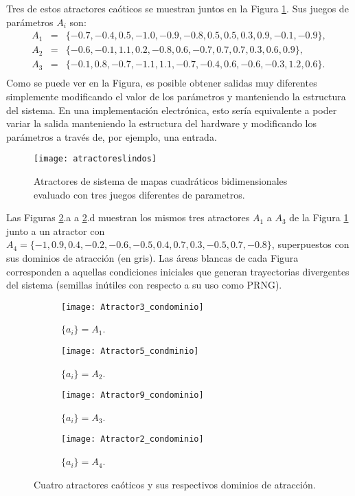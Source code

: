 Tres de estos atractores caóticos se muestran juntos en la Figura \ref{fig:atractoresQMaps}.
Sus juegos de parámetros $A_i$ son:	
%
\begin{eqnarray}
A_1 &=& \{-0.7,-0.4,0.5,-1.0,-0.9,-0.8,0.5,0.5,0.3,0.9,-0.1,-0.9\},\nonumber\\
A_2 &=& \{-0.6,-0.1,1.1,0.2,-0.8,0.6,-0.7,0.7,0.7,0.3,0.6,0.9\}, \nonumber\\
A_3 &=& \{-0.1,0.8,-0.7,-1.1,1.1,-0.7,-0.4,0.6,-0.6,-0.3,1.2,0.6\}.\nonumber\\
\end{eqnarray}
%
Como se puede ver en la Figura, es posible obtener salidas muy diferentes simplemente modificando el valor de los parámetros y manteniendo la estructura del sistema.
En una implementación electrónica, esto sería equivalente a poder variar la salida manteniendo la estructura del hardware y modificando los parámetros a través de, por ejemplo, una entrada.
%
\begin{figure}
	\centering
	\texttt{[image: atractoreslindos]}\\
	\caption{Atractores de sistema de mapas cuadráticos bidimensionales evaluado con tres juegos diferentes de parametros.}\label{fig:atractoresQMaps}
\end{figure}

Las Figuras \ref{fig:atractores3592}.a a \ref{fig:atractores3592}.d muestran los mismos tres atractores $A_1$ a $A_3$ de la Figura \ref{fig:atractoresQMaps} junto a un atractor con $A_4 = \{-1, 0.9, 0.4, -0.2, -0.6,-0.5, 0.4, 0.7, 0.3, -0.5, 0.7, -0.8\}$, superpuestos con sus dominios de atracción (en gris).
Las áreas blancas de cada Figura corresponden a aquellas condiciones iniciales que generan trayectorias divergentes del sistema (semillas inútiles con respecto a su uso como PRNG).	
%
\begin{figure}
	\centering
	\begin{subfigure}[b]{0.49\textwidth}
		\texttt{[image: Atractor3\_condominio]}
		\caption{$\{a_i\}=A_1$.}
	\end{subfigure}
	\hfill 
	\begin{subfigure}[b]{0.49\textwidth}
		\texttt{[image: Atractor5\_condminio]}
		\caption{$\{a_i\}=A_2$.}
	\end{subfigure}
	\hfill 
	\begin{subfigure}[b]{0.49\textwidth}
		\texttt{[image: Atractor9\_condominio]}
		\caption{$\{a_i\}=A_3$.}
	\end{subfigure}
	\hfill  
	\begin{subfigure}[b]{0.49\textwidth}
		\texttt{[image: Atractor2\_condominio]}
		\caption{$\{a_i\}=A_4$.}
	\end{subfigure}
	\caption{Cuatro atractores caóticos y sus respectivos dominios de atracción.}
	\label{fig:atractores3592}
\end{figure}


